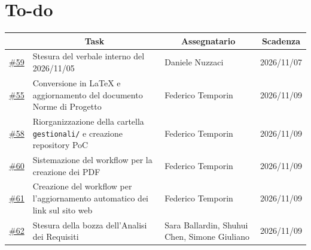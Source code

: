 \documentclass[11pt, a4paper]{article}
\begin{document}
\newpage
\section{To-do}
\begin{table}[h]
    \centering
    \renewcommand{\arraystretch}{1.5}
    \begin{tabularx}{\textwidth}{|c|X|p{3.15cm}|c|}
        \hline
        \rowcolor{gray!10} 
        \multicolumn{1}{|c|}{\textbf{ID issue}} & 
        \multicolumn{1}{c|}{\textbf{Task}} & 
        \multicolumn{1}{c|}{\textbf{Assegnatario}} & 
        \multicolumn{1}{c|}{\textbf{Scadenza}} \\
        \hline
        \href{https://github.com/On-By-One-Team/On-By-One.github.io/issues/59}{\#59} & Stesura del verbale interno del 2026/11/05 & Daniele Nuzzaci & 2026/11/07 \\
        \hline
        \href{https://github.com/On-By-One-Team/On-By-One.github.io/issues/55}{\#55} & Conversione in LaTeX e aggiornamento del documento Norme di Progetto & Federico Temporin & 2026/11/09 \\
        \hline
        \href{https://github.com/On-By-One-Team/On-By-One.github.io/issues/58}{\#58} & Riorganizzazione della cartella \texttt{gestionali/} e creazione repository PoC & Federico Temporin & 2026/11/09 \\
        \hline
        \href{https://github.com/On-By-One-Team/On-By-One.github.io/issues/60}{\#60} & Sistemazione del workflow per la creazione dei PDF & Federico Temporin & 2026/11/09 \\
        \hline
        \href{https://github.com/On-By-One-Team/On-By-One.github.io/issues/61}{\#61} & Creazione del workflow per l'aggiornamento automatico dei link sul sito web & Federico Temporin & 2026/11/09 \\
        \hline
        \href{https://github.com/On-By-One-Team/On-By-One.github.io/issues/62}{\#62} & Stesura della bozza dell'Analisi dei Requisiti & Sara Ballardin, Shuhui Chen, Simone Giuliano & 2026/11/09 \\
        \hline
    \end{tabularx}
\end{table}
\end{document}
